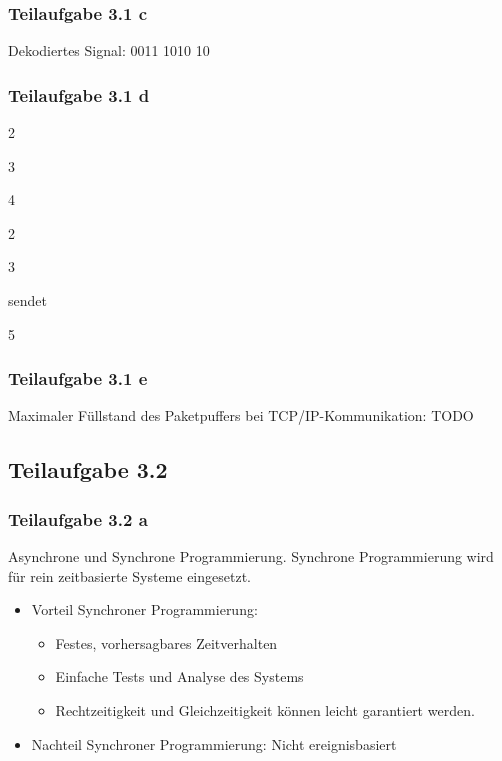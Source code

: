 \documentclass[a4paper]{scrartcl}
\begin{document}
  \subsubsection*{Teilaufgabe 3.1 c}
  Dekodiertes Signal: 0011 1010 10

  \subsubsection*{Teilaufgabe 3.1 d}
  \begin{enumerate*}[label=(l\arabic*)]
      \item 2
      \item 3
      \item 4
      \item 2
      \item 3
      \item sendet
      \item 5
  \end{enumerate*}

  \subsubsection*{Teilaufgabe 3.1 e}
  Maximaler Füllstand des Paketpuffers bei TCP/IP-Kommunikation: TODO

  \subsection*{Teilaufgabe 3.2}
  \subsubsection*{Teilaufgabe 3.2 a}
  Asynchrone und Synchrone Programmierung.
  Synchrone Programmierung wird für rein zeitbasierte Systeme eingesetzt.

  \begin{itemize}
      \item Vorteil Synchroner Programmierung:
      \begin{itemize}
          \item Festes, vorhersagbares Zeitverhalten
          \item Einfache Tests und Analyse des Systems
          \item Rechtzeitigkeit und Gleichzeitigkeit können leicht garantiert
                werden.
      \end{itemize}
      \item Nachteil Synchroner Programmierung: Nicht ereignisbasiert
  \end{itemize}
\end{document}

